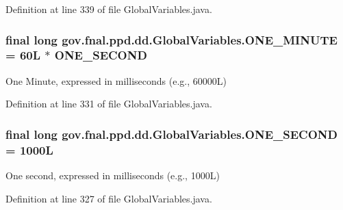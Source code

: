 Definition at line 339 of file Global\-Variables.\-java.

\hypertarget{classgov_1_1fnal_1_1ppd_1_1dd_1_1GlobalVariables_a79fc1e35198b44168537a85aa4c2d942}{
\subsubsection[{O\-N\-E\-\_\-\-M\-I\-N\-U\-T\-E}]{\setlength{\rightskip}{0pt plus 5cm}final long gov.\-fnal.\-ppd.\-dd.\-Global\-Variables.\-O\-N\-E\-\_\-\-M\-I\-N\-U\-T\-E = 60\-L $\ast$ O\-N\-E\-\_\-\-S\-E\-C\-O\-N\-D\hspace{0.3cm}{\ttfamily [static]}}}\label{classgov_1_1fnal_1_1ppd_1_1dd_1_1GlobalVariables_a79fc1e35198b44168537a85aa4c2d942}
One Minute, expressed in milliseconds (e.\-g., 60000\-L) 

Definition at line 331 of file Global\-Variables.\-java.

\hypertarget{classgov_1_1fnal_1_1ppd_1_1dd_1_1GlobalVariables_a3718d8133f257fcc337f5131c8e22d48}{
\subsubsection[{O\-N\-E\-\_\-\-S\-E\-C\-O\-N\-D}]{\setlength{\rightskip}{0pt plus 5cm}final long gov.\-fnal.\-ppd.\-dd.\-Global\-Variables.\-O\-N\-E\-\_\-\-S\-E\-C\-O\-N\-D = 1000\-L\hspace{0.3cm}{\ttfamily [static]}}}\label{classgov_1_1fnal_1_1ppd_1_1dd_1_1GlobalVariables_a3718d8133f257fcc337f5131c8e22d48}
One second, expressed in milliseconds (e.\-g., 1000\-L) 

Definition at line 327 of file Global\-Variables.\-java.

